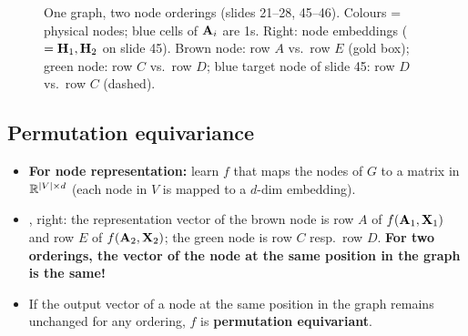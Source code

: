 \begin{figure}[htbp]
  \caption{One graph, two node orderings (slides 21--28, 45--46). Colours =
  physical nodes; blue cells of $\mathbf{A}_i$ are 1s. Right: node embeddings
  ($=\mathbf{H}_1,\mathbf{H}_2$ on slide 45). Brown node: row $A$ vs.\ row $E$ (gold box);
  green node: row $C$ vs.\ row $D$; blue target node of slide 45: row $D$ vs.\
  row $C$ (dashed).}
  \label{fig:lec03-orders}
\end{figure}

\subsection{Permutation equivariance}\label{sec:lec03-perm-eqv}

\begin{itemize}
  \item \textbf{For node representation:} learn $f$ that maps the nodes of $G$
    to a matrix in $\mathbb{R}^{|V|\times d}$ (each node in $V$ is mapped to a $d$-dim
    embedding).
  \item {}, right: the representation vector of the brown
    node is row $A$ of $f(\mathbf{A}_1,\mathbf{X}_1)$ and row $E$ of $f(\mathbf{A}_2,\mathbf{X}_2)$; the green
    node is row $C$ resp.\ row $D$. \textbf{For two orderings, the vector of
    the node at the same position in the graph is the same!}
  \item If the output vector of a node at the same position in the graph
    remains unchanged for any ordering, $f$ is \textbf{permutation
    equivariant}.
\end{itemize}


